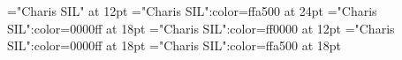 \documentclass[a4paper]{article}
\begin{document}
\pagestyle{plain}
\sloppy
\setlength{\parfillskip}{0pt plus 1fil}
\font\main="Charis SIL" at 12pt
\font\abcmain="Charis SIL":color=ffa500 at 24pt
\font\amain="Charis SIL":color=0000ff at 18pt
\font\bmain="Charis SIL":color=ff0000 at 12pt
\font\abenmain="Charis SIL":color=0000ff at 18pt
\font\acmain="Charis SIL":color=ffa500 at 18pt
\newpage 
\thispagestyle{empty} 
\mbox{} 
\newpage 
\newpage 
\setcounter{page}{1} 
\pagestyle{fancy} 






\end{document}
